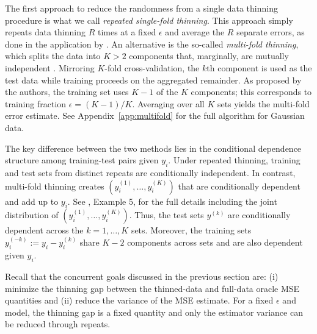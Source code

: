 \documentclass[11pt]{article}
\theoremstyle{plain}
\theoremstyle{definition}
\theoremstyle{remark}
\begin{document}

The first approach to reduce the randomness from a single data thinning procedure is what we call \textit{repeated single-fold thinning}.
This approach simply repeats data thinning $R$ times at a fixed $\epsilon$ and average the $R$ separate errors, as done in the application by \citet{dharamshi_generalized_2025}. An alternative is the so-called \textit{multi-fold thinning}, which splits the data into $K > 2$ components that, marginally, are mutually independent \citep{neufeld_data_2024}. Mirroring $K$-fold cross-validation, the $k$th component is used as the test data while training proceeds on the aggregated remainder. As proposed by the authors, the training set uses $K-1$ of the $K$ components; this corresponds to training fraction $\epsilon = (K-1)/K$. Averaging over all $K$ sets yields the multi-fold error estimate. See Appendix~\ref{app:multifold} for the full algorithm for Gaussian data.

The key difference between the two methods lies in the conditional dependence structure among training-test pairs given $y_i$. Under repeated thinning, training and test sets from distinct repeats are conditionally independent. In contrast, multi-fold thinning creates $(y_i^{(1)}, \ldots, y_i^{(K)})$ that are conditionally dependent and add up to $y_i$.  See \citet{neufeld_data_2024}, Example 5, for the full details including the joint distribution of $(y_i^{(1)}, \ldots, y_i^{(K)})$. Thus, the test sets $y^{(k)}$ are conditionally dependent across the $k=1, \ldots, K$ sets. Moreover, the training sets $y_i^{(-k)} := y_i - y_i^{(k)}$ share $K-2$ components across sets and are also dependent given $y_i$.


Recall that the concurrent goals discussed in the previous section are: (i) minimize the thinning gap between the thinned-data and full-data oracle MSE quantities and (ii) reduce the variance of the MSE estimate. For a fixed $\epsilon$ and model, the thinning gap is a fixed quantity and only the estimator variance can be reduced through repeats.
\end{document}
